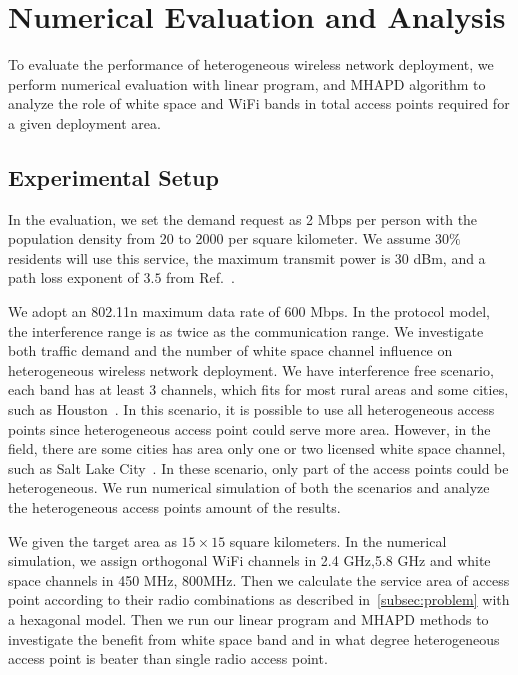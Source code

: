 \section{Numerical Evaluation and Analysis}
\label{sec:moaexperimentdesign}

To evaluate the performance of heterogeneous wireless network deployment, we perform  
numerical evaluation with linear program, and MHAPD algorithm to analyze the role
of white space and WiFi bands in total access points required for a given deployment 
area.

\subsection{Experimental Setup}

In the evaluation, we set the demand request as 2 Mbps per person with the population
density from 20 to 2000 per square kilometer. We assume $30\%$ residents will use this
service, the maximum transmit power is 30 dBm, and a path loss exponent of $3.5$ from 
Ref.~\cite{meikle2012global}. 

We adopt an 802.11n maximum data rate of 600 Mbps. In the protocol model, the interference 
range is as twice as the communication range. We investigate both traffic demand and the 
number of white space channel influence on heterogeneous wireless network deployment. 
We have interference free scenario, each band has at least 3 channels, which fits for
most rural areas and some cities, such as Houston~\cite{googledatabase}. In this scenario,
it is possible to use all heterogeneous access points since heterogeneous access point could 
serve more area. However, in the field, there are some cities has area only one or two 
licensed white space channel, such as Salt Lake City~\cite{googledatabase}. In these scenario, 
only part of the access points could be heterogeneous. We run numerical simulation of
both the scenarios and analyze the heterogeneous access points amount of the results.

We given the target area as $15\times 15$ square kilometers. In the numerical simulation, 
we assign orthogonal WiFi channels in 2.4 GHz,5.8 GHz and white space 
channels in 450 MHz, 800MHz. Then we calculate the service area of access point according to 
their radio combinations as described in~\ref{subsec:problem} with a hexagonal model. Then we 
run our linear program and MHAPD methods to investigate the benefit from white space band 
and in what degree heterogeneous access point is beater than single radio access point. 


